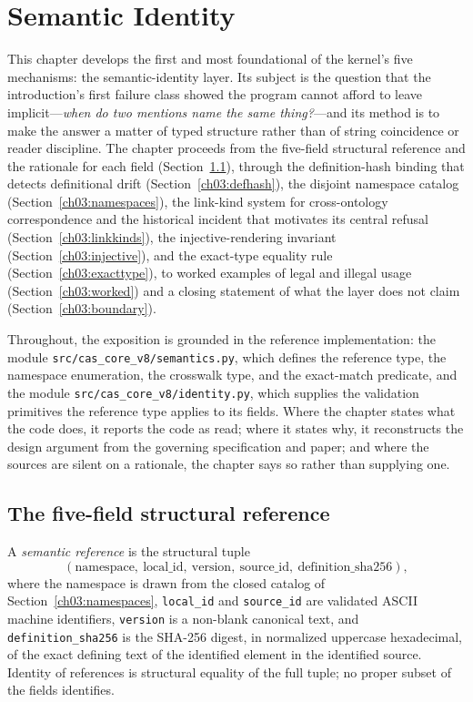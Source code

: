 \chapter{Semantic Identity}\label{ch03:identity}

This chapter develops the first and most foundational of the kernel's
five mechanisms: the semantic-identity layer. Its subject is the
question that the introduction's first failure class showed the
program cannot afford to leave implicit---\emph{when do two mentions
name the same thing?}---and its method is to make the answer a matter
of typed structure rather than of string coincidence or reader
discipline. The chapter proceeds from the five-field structural
reference and the rationale for each field
(Section~\ref{ch03:fivefield}), through the definition-hash binding
that detects definitional drift (Section~\ref{ch03:defhash}), the
disjoint namespace catalog (Section~\ref{ch03:namespaces}), the
link-kind system for cross-ontology correspondence and the historical
incident that motivates its central refusal
(Section~\ref{ch03:linkkinds}), the injective-rendering invariant
(Section~\ref{ch03:injective}), and the exact-type equality rule
(Section~\ref{ch03:exacttype}), to worked examples of legal and
illegal usage (Section~\ref{ch03:worked}) and a closing statement of
what the layer does not claim (Section~\ref{ch03:boundary}).

Throughout, the exposition is grounded in the reference
implementation: the module \texttt{src/cas\_core\_v8/semantics.py},
which defines the reference type, the namespace enumeration, the
crosswalk type, and the exact-match predicate, and the module
\texttt{src/cas\_core\_v8/identity.py}, which supplies the
validation primitives the reference type applies to its fields.
Where the chapter states what the code does, it reports the code as
read; where it states why, it reconstructs the design argument from
the governing specification and paper; and where the sources are
silent on a rationale, the chapter says so rather than supplying
one.

\section{The five-field structural reference}\label{ch03:fivefield}

\begin{definition}\label{ch03:def-semref}
A \emph{semantic reference} is the structural tuple
\[
(\text{namespace},\ \text{local\_id},\ \text{version},\
\text{source\_id},\ \text{definition\_sha256}),
\]
where the namespace is drawn from the closed catalog of
Section~\ref{ch03:namespaces}, \texttt{local\_id} and
\texttt{source\_id} are validated ASCII machine identifiers,
\texttt{version} is a non-blank canonical text, and
\texttt{definition\_sha256} is the SHA-256 digest, in normalized
uppercase hexadecimal, of the exact defining text of the identified
element in the identified source. Identity of references is
structural equality of the full tuple; no proper subset of the
fields identifies.
\end{definition}

